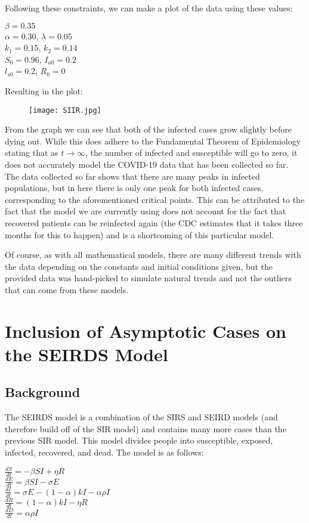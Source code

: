 \documentclass[12pt]{article} %
\begin{document}
Following these constraints, we can make a plot of the data using these values:
\begin{center}
$\beta = 0.35$\\
$\alpha = 0.30$,
$\lambda = 0.05$\\
$k_1 = 0.15$, 
$k_2 = 0.14$\\
$S_0 = 0.96$,
$I_{a0} = 0.2$\\
$l_{s0} = 0.2$,
$R_0 = 0$
\end{center}

Resulting in the plot:
\begin{figure}[h!]
\centering
\texttt{[image: SIIR.jpg]}
\end{figure}

From the graph we can see that both of the infected cases grow slightly before dying out. While this does adhere to the Fundamental Theorem of Epidemiology stating that as $t \rightarrow \infty$, the number of infected and susceptible will go to zero, it does not accurately model the COVID-19 data that has been collected so far. The data collected so far shows that there are many peaks in infected populations, but in here there is only one peak for both infected cases, corresponding to the aforementioned critical points. This can be attributed to the fact that the model we are currently using does not account for the fact that recovered patients can be reinfected again (the CDC estimates that it takes three months for this to happen) and is a shortcoming of this particular model. 

Of course, as with all mathematical models, there are many different trends with the data depending on the constants and initial conditions given, but the provided data was hand-picked to simulate natural trends and not the outliers that can come from these models.

\section{Inclusion of Asymptotic Cases on the SEIRDS Model}
\subsection {Background}
The SEIRDS model is a combination of the SIRS and SEIRD models (and therefore build off of the SIR model) and contains many more cases than the previous SIR model. This model divides people into susceptible, exposed, infected, recovered, and dead. The model is as follows:
\begin{center}
$\frac{dS}{dt} = -\beta SI + \eta R$\\
$\frac{dE}{dt} = \beta SI - \sigma E$\\
$\frac{dI}{dt} = \sigma E - (1-\alpha)k I-\alpha \rho I$\\
$\frac{dR}{dt} = (1-\alpha)kI - \eta R$\\
$\frac{dD}{dt} = \alpha \rho I$\\
\end{center}
\end{document}
